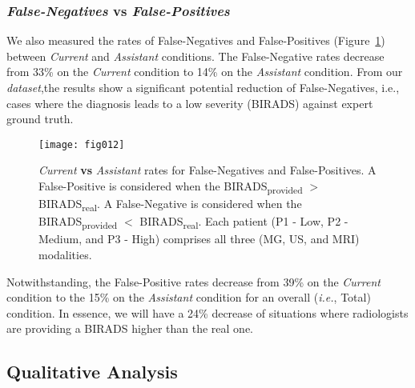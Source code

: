 \subsubsection{{\it False-Negatives} vs {\it False-Positives}}

We also measured the rates of False-Negatives and False-Positives (Figure~\ref{fig:fig012}) between {\it Current} and {\it Assistant} conditions. The False-Negative rates decrease from 33\% on the {\it Current} condition to 14\% on the {\it Assistant} condition.
From our {\it dataset},\footnotemark[14] the results show a significant potential reduction of False-Negatives, i.e., cases where the diagnosis leads to a low severity (BIRADS) against expert ground truth.


\begin{figure}[ht]
\centering
\texttt{[image: fig012]}
\caption{{\it Current} {\bf vs} {\it Assistant} rates for False-Negatives and False-Positives. A False-Positive is considered when the BIRADS\textsubscript{provided} $>$ BIRADS\textsubscript{real}. A False-Negative is considered when the BIRADS\textsubscript{provided} $<$ BIRADS\textsubscript{real}. Each patient (P1 - Low, P2 - Medium, and P3 - High) comprises all three (MG, US, and MRI) modalities.}
\label{fig:fig012}
\end{figure}

Notwithstanding, the False-Positive rates decrease from 39\% on the {\it Current} condition to the 15\% on the {\it Assistant} condition for an overall ({\it i.e.}, Total) condition.
In essence, we will have a 24\% decrease of situations where radiologists are providing a BIRADS higher than the real one.

\subsection{Qualitative Analysis}
\label{sec:qualitative}

